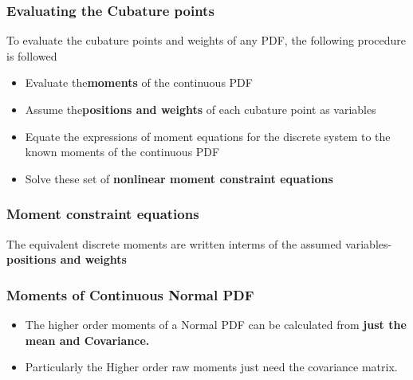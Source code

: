 \documentclass{beamer}
\begin{document}
\begin{frame}
\frametitle{Evaluating the Cubature points}
To evaluate the cubature points and weights of any PDF, the following procedure is followed 
\begin{itemize}[<+->]
\item Evaluate the{\bf  moments} of the continuous PDF
\item Assume the{\bf positions and weights} of each cubature point as variables
\item Equate the expressions of moment equations for the discrete system to the known moments of the continuous PDF
\item Solve these set of {\bf nonlinear moment constraint equations} 
\end{itemize}
\end{frame}
\begin{frame}
\frametitle{Moment constraint equations  }
 The equivalent discrete moments are written interms of the assumed variables- {\bf positions and weights}

\end{frame}
\begin{frame}
\frametitle{Moments of Continuous Normal PDF}
\begin{itemize}[<+->]
\item The higher order moments of a Normal PDF can be calculated from {\bf just the mean and Covariance.}
\item Particularly the Higher order raw moments just need the covariance matrix. 
\end{itemize}
\end{frame}
\end{document}
